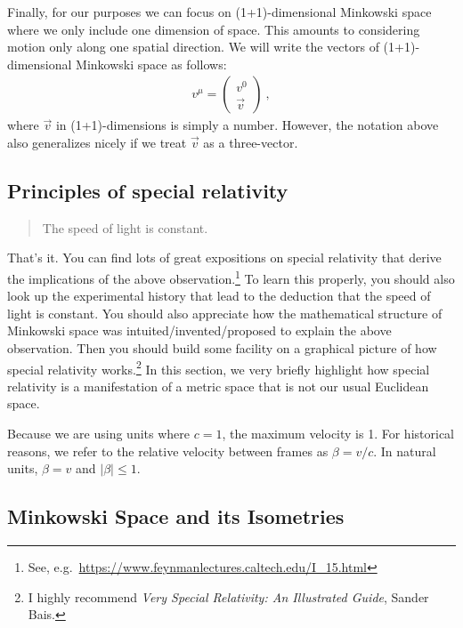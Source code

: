 \documentclass[12pt]{article}
\begin{document}
Finally, for our purposes we can focus on (1+1)-dimensional Minkowski space where we only include one dimension of space. This amounts to considering motion only along one spatial direction. We will write the vectors of (1+1)-dimensional Minkowski space as follows:
\begin{align}
    v^\mu = 
    \begin{pmatrix}
    v^0\\
    \vec{v}    
    \end{pmatrix} \ ,
\end{align}
where $\vec{v}$ in (1+1)-dimensions is simply a number. However, the notation above also generalizes nicely if we treat $\vec{v}$ as a three-vector. 



\subsection{Principles of special relativity}

\begin{quote}
The speed of light is constant.
\end{quote}

That's it. You can find lots of great expositions on special relativity that derive the implications of the above observation.\footnote{See, e.g.~\url{https://www.feynmanlectures.caltech.edu/I_15.html}} To learn this properly, you should also look up the experimental history that lead to the deduction that the speed of light is constant. You should also appreciate how the mathematical structure of Minkowski space was intuited/invented/proposed to explain the above observation. Then you should build some facility on a graphical picture of how special relativity works.\footnote{I highly recommend \emph{Very Special Relativity: An Illustrated Guide}, Sander Bais.} In this section, we very briefly highlight how special relativity is a manifestation of a metric space that is not our usual Euclidean space. 

Because we are using units where $c=1$, the maximum velocity is 1. For historical reasons, we refer to the relative velocity between frames as $\beta = v/c$. In natural units, $\beta = v$ and $|\beta| \leq 1$.  

\subsection{Minkowski Space and its Isometries} 
\end{document}
